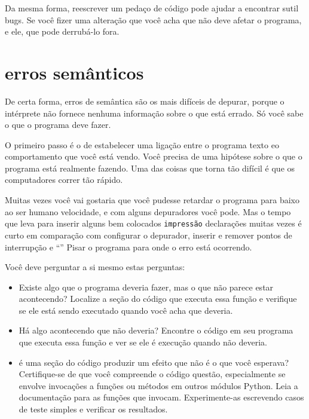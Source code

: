 \documentclass[10pt]{book}
\begin{document}
\begin{exercise}
\begin{v erbatim}
Da mesma forma, reescrever um pedaço de código pode ajudar a encontrar sutil
bugs. Se você fizer uma alteração que você acha que não deve afetar o
programa, e ele, que pode derrubá-lo fora.


\section{erros semânticos}

De certa forma, erros de semântica são os mais difíceis de depurar,
porque o intérprete não fornece nenhuma informação
sobre o que está errado. Só você sabe o que o programa deve
fazer.

O primeiro passo é o de estabelecer uma ligação entre o programa
texto eo comportamento que você está vendo. Você precisa de uma hipótese
sobre o que o programa está realmente fazendo. Uma das coisas
que torna tão difícil é que os computadores correr tão rápido.

Muitas vezes você vai gostaria que você pudesse retardar o programa para baixo ao ser humano
velocidade, e com alguns depuradores você pode. Mas o tempo que leva para
inserir alguns bem colocados {\tt impressão} declarações muitas vezes é curto em comparação com
configurar o depurador, inserir e remover pontos de interrupção e
``'' Pisar o programa para onde o erro está ocorrendo.


Você deve perguntar a si mesmo estas perguntas:

\begin{itemize}

\item Existe algo que o programa deveria fazer, mas
o que não parece estar acontecendo? Localize a seção do código
que executa essa função e verifique se ele está sendo executado quando
você acha que deveria.

\item Há algo acontecendo que não deveria? Encontre o código em
seu programa que executa essa função e ver se ele é
execução quando não deveria.

\item é uma seção do código produzir um efeito que não é
o que você esperava? Certifique-se de que você compreende o código
questão, especialmente se envolve invocações a funções ou métodos em
outros módulos Python. Leia a documentação para as funções que invocam.
Experimente-as escrevendo casos de teste simples e verificar os resultados.


\end{itemize}
\end{v erbatim}
\end{exercise}
\end{document}
